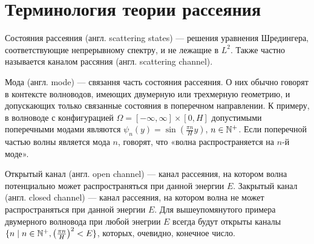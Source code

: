 \section{Терминология теории рассеяния}
Состояния рассеяния (англ. scattering states) — решения уравнения Шредингера, соответствующие непрерывному спектру, и не лежащие в $L^2$. Также частно называется каналом рассяния (англ. scattering channel).

Мода (англ. mode) — связання часть состояния рассеяния. О них обычно говорят в контексте волноводов, имеющих двумерную или трехмерную геометрию, и допускающих только связанные состояния в поперечном направлении. К примеру, в волноводе с конфигурацией $\Omega = [-\infty, \infty] \times [0, H]$ допустимыми поперечными модами являются $\psi_n(y) = \sin(\frac{\pi n}{H} y)$, $n \in \mathbb{N}^+$. Если поперечной частью волны является мода $n$, говорят, что «волна распространяется на $n$-й моде».

Открытый канал (англ. open channel) — канал рассеяния, на котором волна потенциально может распространяться при данной энергии $E$. Закрытый канал (англ. closed channel) — канал рассеяния, на котором волна не может распространяться при данной энергии $E$. Для вышеупомянутого примера двумерного волновода при любой энегрии $E$ всегда будут открыты каналы $\{n \mid n \in \mathbb{N}^+, \left(\frac{\pi n}{H}\right)^2 < E \}$, которых, очевидно, конечное число.

